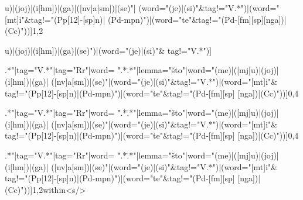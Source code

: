 \noindent\begin{verbatim*}
[!(word="(me)|([mj]u)|(joj)|(i[hm])|(ga)|([nv]a[sm])|(se)"|
(word="(je)|(si)"&tag!="V.*")|(word="[mt]i"&tag!="(Pp[12]-[sp]n)|
(Pd-mpn)")|(word="te"&tag!="(Pd-[fm][sp][nga])|(Cc)"))]{1,2}
\end{verbatim*}



\noindent\begin{verbatim*}
[(word="([mj]u)|(joj)|(i[hm])|(ga)|(se)")|(word="(je)|(si)"&
tag!="V.*")]
\end{verbatim*}



\noindent\begin{verbatim*}
[!(tag="C.*"|lemma="\Z"|tag="P[iq].*"|tag="V.*"|tag="Rr"|word=
".*\..*"|lemma="što"|word="(me)|([mj]u)|(joj)|(i[hm])|(ga)|
([nv]a[sm])|(se)"|(word="(je)|(si)"&tag!="V.*")|(word="[mt]i"&
tag!="(Pp[12]-[sp]n)|(Pd-mpn)")|(word="te"&tag!="(Pd-[fm][sp]
[nga])|(Cc)"))]{0,4}
\end{verbatim*}



\noindent\begin{verbatim*}
[lemma="sramiti" & tag="V.r.*"]
\end{verbatim*}



\noindent\begin{verbatim*}
[!(tag="C.*"|lemma="\Z"|tag="P[iq].*"|tag="V.*"|tag="Rr"|word=
".*\..*"|lemma="što"|word="(me)|([mj]u)|(joj)|(i[hm])|(ga)|
([nv]a[sm])|(se)"|(word="(je)|(si)"&tag!="V.*")|(word="[mt]i"&
tag!="(Pp[12]-[sp]n)|(Pd-mpn)")|(word="te"&tag!="(Pd-[fm][sp]
[nga])|(Cc)"))]{0,4}
\end{verbatim*}



\noindent\begin{verbatim*}
[tag="V.n" & lemma!="biti"]
\end{verbatim*}



\noindent\begin{verbatim*}
[!(tag="C.*"|lemma="\Z"|tag="P[iq].*"|tag="V.*"|tag="Rr"|word=
".*\..*"|lemma="što"|word="(me)|([mj]u)|(joj)|(i[hm])|(ga)|
([nv]a[sm])|(se)"|(word="(je)|(si)"&tag!="V.*")|(word="[mt]i"&
tag!="(Pp[12]-[sp]n)|(Pd-mpn)")|(word="te"&tag!="(Pd-[fm][sp]
[nga])|(Cc)"))]{1,2}within<s/>
\end{verbatim*}


